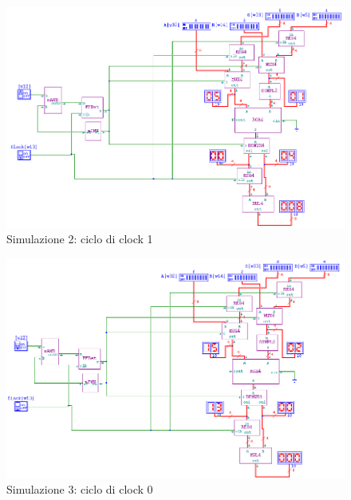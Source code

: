 \documentclass[10pt]{article}
\begin{document}
\begin{itemize}
\begin{figure}[H]
    \begin{minipage}[c]{\textwidth}
    \centering
    \includegraphics[width=\textwidth]{s2c1}
    \caption{Simulazione 2: ciclo di clock 1}
    \label{ }
    \end{minipage}
\end{figure}

\begin{figure}[H]
    \begin{minipage}[c]{\textwidth}
    \centering
    \includegraphics[width=\textwidth]{s3c0}
    \caption{Simulazione 3: ciclo di clock 0}
    \label{ }
    \end{minipage}
\end{figure}


\end{itemize}
\end{document}
